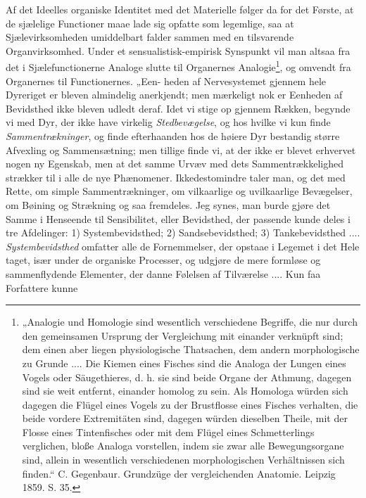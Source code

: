 \documentclass[12pt,a4paper]{book}
\begin{document}
Af det Ideelles organiske Identitet med det Materielle følger da for det
Første, at de sjælelige Functioner maae lade sig opfatte som legemlige,
saa at Sjælevirksomheden umiddelbart falder sammen med en tilsvarende
Organvirksomhed. Under et sensualistisk-empirisk Synspunkt vil man altsaa
fra det i Sjælefunctionerne Analoge slutte til Organernes
Analogie\footnote{„Analogie und Homologie sind wesentlich verschiedene
Begriffe, die nur durch den gemeinsamen Ursprung der Vergleichung mit
einander verknüpft sind; dem einen aber liegen physiologische
Thatsachen, dem andern morphologische zu Grunde .... Die Kiemen eines
Fisches sind die Analoga der Lungen eines Vogels oder Säugethieres, d. h.
sie sind beide Organe der Athmung, dagegen sind sie weit entfernt,
einander homolog zu sein. Als Homologa würden sich dagegen die Flügel
eines Vogels zu der Brustflosse eines Fisches verhalten, die beide
vordere Extremitäten sind, dagegen würden dieselben Theile, mit der
Flosse eines Tintenfisches oder mit dem Flügel eines Schmetterlings
verglichen, bloße Analoga vorstellen, indem sie zwar alle
Bewegungsorgane sind, allein in wesentlich verschiedenen morphologischen
Verhältnissen sich finden.“ C. Gegenbaur. Grundzüge der vergleichenden
Anatomie. Leipzig 1859. S. 35.}, og omvendt fra Organernes til
Functionernes. „Een-
heden af Nervesystemet gjennem hele Dyreriget er bleven almindelig
anerkjendt; men mærkeligt nok er Eenheden af Bevidsthed ikke bleven
udledt deraf. Idet vi stige op gjennem Rækken, begynde vi med Dyr, der
ikke have virkelig \emph{Stedbevægelse}, og hos hvilke vi kun finde
\emph{Sammentrækninger}, og finde efterhaanden hos de høiere Dyr
bestandig større Afvexling og Sammensætning; men tillige finde vi, at der
ikke er blevet erhvervet nogen ny Egenskab, men at det samme Urvæv med
dets Sammentrækkelighed strækker til i alle de nye Phænomener.
Ikkedestomindre taler man, og det med Rette, om simple
Sammentrækninger, om vilkaarlige og uvilkaarlige Bevægelser, om Bøining
og Strækning og saa fremdeles. Jeg synes, man burde gjøre det Samme i
Henseende til Sensibilitet, eller Bevidsthed, der passende kunde deles i
tre Afdelinger: 1) Systembevidsthed; 2) Sandsebevidsthed; 3)
Tankebevidsthed .... \emph{Systembevidsthed} omfatter alle de
Fornemmelser, der opstaae i Legemet i det Hele taget, især under de
organiske Processer, og udgjøre de mere formløse og sammenflydende
Elementer, der danne Følelsen af Tilværelse .... Kun faa Forfattere kunne
\end{document}
